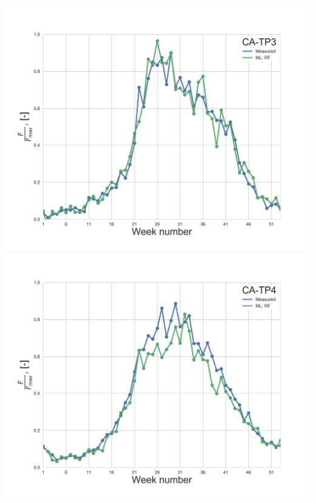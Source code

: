\documentclass{beamer}
\begin{document}
\begin{frame}
\begin{columns}[t]
\centering
\includegraphics[width=\textwidth]{F_scaled_ML_ENF_Only_T_With9010_Quartiles/trains/CA-TP3.png}\\
\includegraphics[width=\textwidth]{F_scaled_ML_ENF_Only_T_With9010_Quartiles/trains/CA-TP4.png}
\end{columns}
\end{frame}



\end{document}
